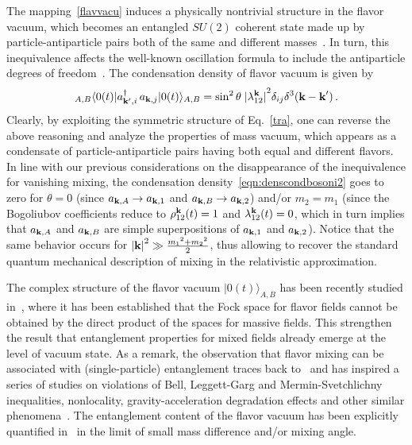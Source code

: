 \documentclass[floats,prd,aps,amssymb,nofootinbib,showkeys]{revtex4}
\def\bogub{{\rho}_{\bk}}
\def\bogvb{{\lambda}_{\bk}}
\def\bogub{{\rho}^{\bf{k}}_{12}}
\def\bogvb{{\lambda}^{\bf{k}}_{12}}
\begin{document}
The mapping~\eqref{flavvacu}
induces a physically nontrivial structure in the
flavor vacuum, which becomes an entangled $SU(2)$ 
coherent state made up by
particle-antiparticle pairs both of the same
and different masses~\cite{BV95}.  In turn, 
this inequivalence affects the well-known oscillation formula to include the antiparticle degrees of freedom~\cite{BlasPlb}. 
The condensation density of flavor vacuum
is given by
\begin{equation}
\label{eqn:denscondbosoni2} 
{}_{A,B}\langle 0(t)| a_{{\bk'},i}^{\dagger}\, a_{{\bf
k},j} |0(t)\rangle_{A,B}= \sin^{2}\theta\; {|\bogvb|}^2\delta_{ij}\delta^3({\textbf{k}-\textbf{k}'})\,.
\end{equation}
Clearly, by exploiting the symmetric structure of
Eq.~\eqref{tra}, one can reverse the above reasoning
and analyze the properties of mass
vacuum, which appears as a condensate of
particle-antiparticle pairs having both equal and different flavors.
In line with our previous considerations 
on the disappearance of the inequivalence
for vanishing mixing, the condensation density~\eqref{eqn:denscondbosoni2}  
goes to zero for $\theta=0$ (since $a_{{\bf {k}},A}\rightarrow a_{{\bf {k}},1}$ and 
$a_{{\bf {k}},B}\rightarrow a_{{\bf {k}},2}$)
and/or $m_2=m_1$ (since the Bogoliubov
coefficients reduce to
$\bogub(t)=1$ and  $\bogvb(t)=0$, which in turn implies
that $a_{{\bf {k}},A}$ and $a_{{\bf {k}},B}$ are simple
superpositions of $a_{{\bf {k}},1}$ and $a_{{\bf {k}},2}$). 
Notice that the same behavior
occurs for ${|{\bf {k}}|}^2\gg\frac{{m_1}^2+{m_2}^2}{2}$, 
thus allowing to recover the standard quantum mechanical 
description of mixing
in the relativistic approximation.

The complex structure of the flavor vacuum
$|0(t)\rangle_{A,B}$ has been recently 
studied in~\cite{Cabo}, 
where it has been
established that the Fock space for flavor fields cannot be obtained by the direct product of the spaces for massive
fields. This strengthen the result that entanglement properties
for mixed fields already emerge
at the level of vacuum state. As a remark, the observation that flavor 
mixing can be associated with (single-particle) entanglement 
traces back to~\cite{Dimauro} and has inspired 
a series of studies on violations of
Bell, Leggett-Garg and Mermin-Svetchlichny inequalities, nonlocality, gravity-acceleration degradation effects and
other similar phenomena~\cite{SimPhe1,SimPhe2,SimPhe3,SimPhe4,SimPhe5}.
The entanglement content of the flavor vacuum 
has been explicitly quantified in~\cite{Vacent} in the 
limit of small mass difference
and/or mixing angle. 
\end{document}
